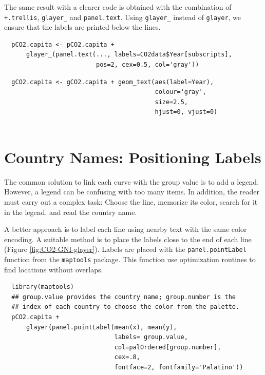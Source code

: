 \documentclass[smallroyalvopaper]{memoir}
\begin{document}
The same result with a clearer code is obtained with the combination
of \texttt{+.trellis}, \texttt{glayer\_} and \texttt{panel.text}. Using \texttt{glayer\_} instead of
\texttt{glayer}, we ensure that the labels are printed below the lines.


\lstset{language=r,label= ,caption= ,captionpos=b,numbers=none}
\begin{lstlisting}
  pCO2.capita <- pCO2.capita +
      glayer_(panel.text(..., labels=CO2data$Year[subscripts],
                         pos=2, cex=0.5, col='gray'))
\end{lstlisting}

\lstset{language=r,label= ,caption= ,captionpos=b,numbers=none}
\begin{lstlisting}
  gCO2.capita <- gCO2.capita + geom_text(aes(label=Year),
                                         colour='gray',
                                         size=2.5,
                                         hjust=0, vjust=0)
  
\end{lstlisting}

\section{Country Names: Positioning Labels}
\label{sec:orge5711bb}
The common solution to link each curve with the group value is to add
a legend. However, a legend can be confusing with too many items. In
addition, the reader must carry out a complex task: Choose the line,
memorize its color, search for it in the legend, and read the country
name.

A better approach is to label each line using nearby text with the
same color encoding. A suitable method is to place the labels
close to the end of each line (Figure
\ref{fig:CO2-GNI-glayer}). Labels are placed with the
\texttt{panel.pointLabel} function from the \texttt{maptools} package. This
function use optimization routines to find locations without
overlaps.


\lstset{language=r,label= ,caption= ,captionpos=b,numbers=none}
\begin{lstlisting}
  library(maptools)  
  ## group.value provides the country name; group.number is the
  ## index of each country to choose the color from the palette.
  pCO2.capita +
      glayer(panel.pointLabel(mean(x), mean(y),
                              labels= group.value,
                              col=palOrdered[group.number],
                              cex=.8,
                              fontface=2, fontfamily='Palatino'))
\end{lstlisting}
\end{document}
